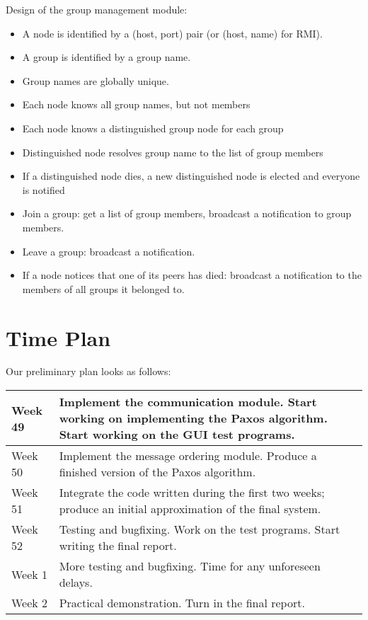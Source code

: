 \documentclass[10pt, oneside]{article}
\begin{document}
Design of the group management module:
\begin{itemize}
\item A node is identified by a (host, port) pair (or (host, name) for RMI).
\item A group is identified by a group name.
\item Group names are globally unique.
\item Each node knows all group names, but not members
\item Each node knows a distinguished group node for each group
\item Distinguished node resolves group name to the list of group members
\item If a distinguished node dies, a new distinguished node is elected and
  everyone is notified
\item Join a group: get a list of group members, broadcast a notification to
  group members.
\item Leave a group: broadcast a notification.
\item If a node notices that one of its peers has died: broadcast a notification
  to the members of all groups it belonged to.
\end{itemize}


\section{Time Plan}

Our preliminary plan looks as follows:

\begin{tabular}{|l|p{10cm}|}
  \hline
  Week 49 & Implement the communication module. Start working on implementing the
  Paxos algorithm. Start working on the GUI test programs. \\
  \hline
  Week 50 & Implement the message ordering module. Produce a finished version of the Paxos algorithm. \\
  \hline
  Week 51 & Integrate the code written during the first two weeks; produce an
  initial approximation of the final system. \\
  \hline
  Week 52 & Testing and bugfixing. Work on the test programs. Start writing the final report. \\
  \hline
  Week 1  & More testing and bugfixing. Time for any unforeseen delays. \\
  \hline
  Week 2  & Practical demonstration. Turn in the final report. \\
  \hline
\end{tabular}
\end{document}
